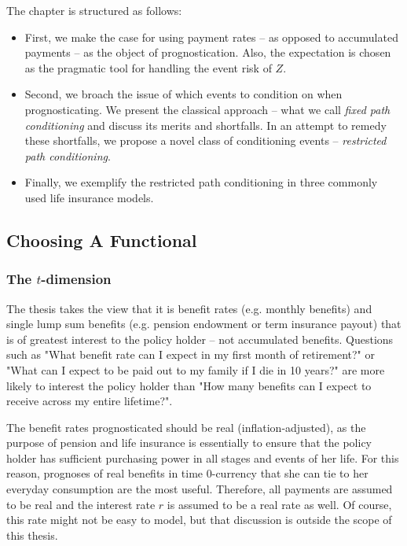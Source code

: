 \documentclass{article}
\newcommand{\1}[1]{\mathbbm{1}_{\left\lbrace #1 \right\rbrace}}
\theoremstyle{break}
\theoremstyle{remark}
\numberwithin{equation}{section}
\begin{document}
The chapter is structured as follows:

\begin{itemize}
	\item First, we make the case for using payment rates -- as opposed to accumulated payments -- as the object of prognostication. Also, the expectation is chosen as the pragmatic tool for handling the event risk of $Z$.
	\item Second, we broach the issue of which events to condition on when prognosticating. We present the classical approach -- what we call \textit{fixed path conditioning} and discuss its merits and shortfalls. In an attempt to remedy these shortfalls, we propose a novel class of conditioning events -- \textit{restricted path conditioning}.
	\item Finally, we exemplify the restricted path conditioning in three commonly used life insurance models.
\end{itemize}

\subsection{Choosing A Functional}

\subsubsection{The $t$-dimension}

The thesis takes the view that it is benefit rates (e.g. monthly benefits) and single lump sum benefits (e.g. pension endowment or term insurance payout) that is of greatest interest to the policy holder -- not accumulated benefits. Questions such as "What benefit rate can I expect in my first month of retirement?" or "What can I expect to be paid out to my family if I die in 10 years?" are more likely to interest the policy holder than "How many benefits can I expect to receive across my entire lifetime?".

The benefit rates prognosticated should be real (inflation-adjusted), as the purpose of pension and life insurance is essentially to ensure that the policy holder has sufficient purchasing power in all stages and events of her life. For this reason, prognoses of real benefits in time 0-currency that she can tie to her everyday consumption are the most useful. Therefore, all payments are assumed to be real and the interest rate $r$ is assumed to be a real rate as well. Of course, this rate might not be easy to model, but that discussion is outside the scope of this thesis.
\end{document}
